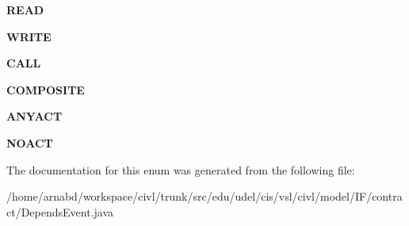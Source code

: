 \begin{DoxyCompactItemize}
\item 
\hypertarget{enumedu_1_1udel_1_1cis_1_1vsl_1_1civl_1_1model_1_1IF_1_1contract_1_1DependsEvent_1_1DependsEventKind_a23e85e0caf8a0d050fe016fd90952059}{}{\bfseries R\+E\+A\+D}\label{enumedu_1_1udel_1_1cis_1_1vsl_1_1civl_1_1model_1_1IF_1_1contract_1_1DependsEvent_1_1DependsEventKind_a23e85e0caf8a0d050fe016fd90952059}

\item 
\hypertarget{enumedu_1_1udel_1_1cis_1_1vsl_1_1civl_1_1model_1_1IF_1_1contract_1_1DependsEvent_1_1DependsEventKind_a36d70718400e52340857bbfed1d364db}{}{\bfseries W\+R\+I\+T\+E}\label{enumedu_1_1udel_1_1cis_1_1vsl_1_1civl_1_1model_1_1IF_1_1contract_1_1DependsEvent_1_1DependsEventKind_a36d70718400e52340857bbfed1d364db}

\item 
\hypertarget{enumedu_1_1udel_1_1cis_1_1vsl_1_1civl_1_1model_1_1IF_1_1contract_1_1DependsEvent_1_1DependsEventKind_adacaff20141424d0a1352db3ab508aa4}{}{\bfseries C\+A\+L\+L}\label{enumedu_1_1udel_1_1cis_1_1vsl_1_1civl_1_1model_1_1IF_1_1contract_1_1DependsEvent_1_1DependsEventKind_adacaff20141424d0a1352db3ab508aa4}

\item 
\hypertarget{enumedu_1_1udel_1_1cis_1_1vsl_1_1civl_1_1model_1_1IF_1_1contract_1_1DependsEvent_1_1DependsEventKind_a50d64b62749f785bd77e076639d22f92}{}{\bfseries C\+O\+M\+P\+O\+S\+I\+T\+E}\label{enumedu_1_1udel_1_1cis_1_1vsl_1_1civl_1_1model_1_1IF_1_1contract_1_1DependsEvent_1_1DependsEventKind_a50d64b62749f785bd77e076639d22f92}

\item 
\hypertarget{enumedu_1_1udel_1_1cis_1_1vsl_1_1civl_1_1model_1_1IF_1_1contract_1_1DependsEvent_1_1DependsEventKind_a09026c2584d9524a04998988546904e9}{}{\bfseries A\+N\+Y\+A\+C\+T}\label{enumedu_1_1udel_1_1cis_1_1vsl_1_1civl_1_1model_1_1IF_1_1contract_1_1DependsEvent_1_1DependsEventKind_a09026c2584d9524a04998988546904e9}

\item 
\hypertarget{enumedu_1_1udel_1_1cis_1_1vsl_1_1civl_1_1model_1_1IF_1_1contract_1_1DependsEvent_1_1DependsEventKind_a16525ccc191626811db7be0d9644ce96}{}{\bfseries N\+O\+A\+C\+T}\label{enumedu_1_1udel_1_1cis_1_1vsl_1_1civl_1_1model_1_1IF_1_1contract_1_1DependsEvent_1_1DependsEventKind_a16525ccc191626811db7be0d9644ce96}

\end{DoxyCompactItemize}


The documentation for this enum was generated from the following file\+:\begin{DoxyCompactItemize}
\item 
/home/arnabd/workspace/civl/trunk/src/edu/udel/cis/vsl/civl/model/\+I\+F/contract/Depends\+Event.\+java\end{DoxyCompactItemize}
